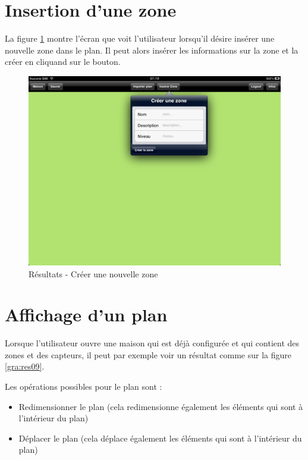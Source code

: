 
\clearpage


\section{Insertion d'une zone} %
\label{sub:insertion_d_une_zone}
La figure \ref{gra:res08} montre l'écran que voit l'utilisateur lorsqu'il désire insérer une nouvelle zone dans le plan. Il peut alors insérer les informations sur la zone et la créer en cliquand sur le bouton.
\begin{figure}[H]
        \centering
        \includegraphics[width=\textwidth]{00_media/07_08.PNG}
        \caption{Résultats - Créer une nouvelle zone}
        \label{gra:res08}
\end{figure}

\clearpage


\section{Affichage d'un plan} %
\label{sub:subsection_ame}
Lorsque l'utilisateur ouvre une maison qui est déjà configurée et qui contient des zones et des capteurs, il peut par exemple voir un résultat comme sur la figure \ref{gra:res09}.

\medskip

Les opérations possibles pour le plan sont : 

\medskip

\begin{itemize}
    \item Redimensionner le plan (cela redimensionne également les éléments qui sont à l'intérieur du plan)
    \item Déplacer le plan (cela déplace également les éléments qui sont à l'intérieur du plan)
\end{itemize}

